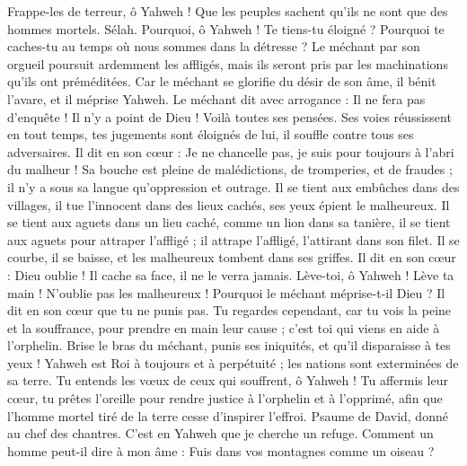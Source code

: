 \begin{multicols}{2}
Frappe-les de terreur, ô Yahweh ! Que les peuples sachent qu'ils ne sont que des hommes mortels. Sélah.
\VerseOne{}Pourquoi, ô Yahweh ! Te tiens-tu éloigné ? Pourquoi te caches-tu au temps où nous sommes dans la détresse ?
Le méchant par son orgueil poursuit ardemment les affligés, mais ils seront pris par les machinations qu'ils ont préméditées.
Car le méchant se glorifie du désir de son âme, il bénit l'avare, et il méprise Yahweh.
Le méchant dit avec arrogance : Il ne fera pas d'enquête ! Il n'y a point de Dieu ! Voilà toutes ses pensées.
Ses voies réussissent en tout temps, tes jugements sont éloignés de lui, il souffle contre tous ses adversaires.
Il dit en son cœur : Je ne chancelle pas, je suis pour toujours à l'abri du malheur !
Sa bouche est pleine de malédictions, de tromperies, et de fraudes ; il n'y a sous sa langue qu'oppression et outrage.
Il se tient aux embûches dans des villages, il tue l'innocent dans des lieux cachés, ses yeux épient le malheureux.
Il se tient aux aguets dans un lieu caché, comme un lion dans sa tanière, il se tient aux aguets pour attraper l'affligé ; il attrape l'affligé, l'attirant dans son filet.
Il se courbe, il se baisse, et les malheureux tombent dans ses griffes.
Il dit en son cœur : Dieu oublie ! Il cache sa face, il ne le verra jamais.
Lève-toi, ô Yahweh ! Lève ta main ! N'oublie pas les malheureux !
Pourquoi le méchant méprise-t-il Dieu ? Il dit en son cœur que tu ne punis pas.
Tu regardes cependant, car tu vois la peine et la souffrance, pour prendre en main leur cause ; c'est toi qui viens en aide à l'orphelin.
Brise le bras du méchant, punis ses iniquités, et qu'il disparaisse à tes yeux !
Yahweh est Roi à toujours et à perpétuité ; les nations sont exterminées de sa terre.
Tu entends les vœux de ceux qui souffrent, ô Yahweh ! Tu affermis leur cœur, tu prêtes l'oreille
pour rendre justice à l'orphelin et à l'opprimé, afin que l'homme mortel tiré de la terre cesse d'inspirer l'effroi.
\VerseOne{}Psaume de David, donné au chef des chantres. C'est en Yahweh que je cherche un refuge. Comment un homme peut-il dire à mon âme : Fuis dans vos montagnes comme un oiseau ?

\end{multicols}
